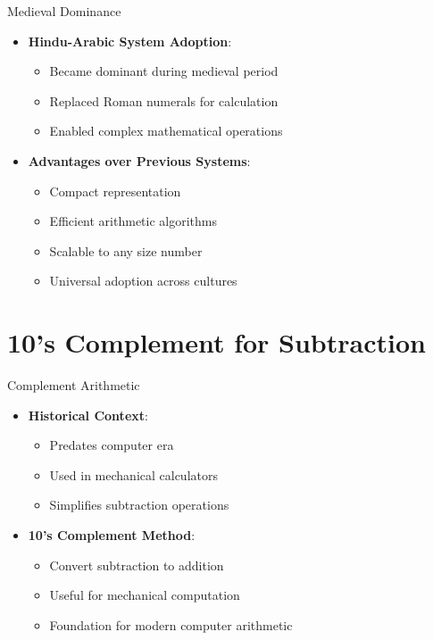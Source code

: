 \documentclass[aspectratio=169,11pt]{beamer}
\newcommand{\concept}[1]{\textbf{\color{accentcolor}#1}}
\begin{document}
\begin{frame}{Medieval Dominance}
\begin{itemize}
\item \concept{Hindu-Arabic System Adoption}:
\begin{itemize}
\item Became dominant during medieval period
\item Replaced Roman numerals for calculation
\item Enabled complex mathematical operations
\end{itemize}
\vspace{0.5cm}
\item \concept{Advantages over Previous Systems}:
\begin{itemize}
\item Compact representation
\item Efficient arithmetic algorithms
\item Scalable to any size number
\item Universal adoption across cultures
\end{itemize}
\end{itemize}
\end{frame}

\section{10's Complement for Subtraction}

\begin{frame}{Complement Arithmetic}
\begin{itemize}
\item \concept{Historical Context}:
\begin{itemize}
\item Predates computer era
\item Used in mechanical calculators
\item Simplifies subtraction operations
\end{itemize}
\vspace{0.5cm}
\item \concept{10's Complement Method}:
\begin{itemize}
\item Convert subtraction to addition
\item Useful for mechanical computation
\item Foundation for modern computer arithmetic
\end{itemize}
\end{itemize}
\end{frame}
\end{document}
